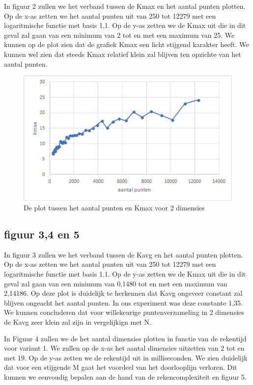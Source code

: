 \documentclass[12pt]{article}
\begin{document}
In figuur 2 zullen we het verband tussen de Kmax en het aantal punten plotten.
Op de x-as zetten we het aantal punten uit van 250 tot 12279 met een logaritmische functie met basis 1,1.
Op de y-as zetten we de Kmax uit die in dit geval zal gaan van een minimum van 2 tot en met een maximum van 25.
We kunnen op de plot zien dat de grafiek Kmax een licht stijgend karakter heeft.
We kunnen wel zien dat steeds Kmax relatief klein zal blijven ten opzichte van het aantal punten.

\begin{figure}
\includegraphics[width=\textwidth]{punten-Kmax.png}
\caption{De plot tussen het aantal punten en Kmax voor 2 dimensies}
\end{figure}

\subsection{figuur 3,4 en 5}

In figuur 3 zullen we het verband tussen de Kavg en het aantal punten plotten.
Op de x-as zetten we het aantal punten uit van 250 tot 12279 met een logaritmische functie met basis 1.1.
Op de y-as zetten we de Kmax uit die in dit geval zal gaan van een minimum van 0,1480 tot en met een maximum van 2,14186.
Op deze plot is duidelijk te herkennen dat Kavg ongeveer constant zal blijven ongeacht het aantal punten.
In ons experiment was deze constante 1,35.
We kunnen concluderen dat voor willekeurige puntenverzameling in 2 dimensies de Kavg zeer klein zal zijn in vergelijkign met N.

In Figuur 4 zullen we de het aantal dimensies plotten in functie van de rekentijd voor variant 1.
We zullen op de x-as het aantal dimensies uitzetten van 2 tot en met 19.
Op de y-as zetten we de rekentijd uit in milliseconden.
We zien duidelijk dat voor een stijgende M gaat het voordeel van het doorlooplijn verloren.
Dit kunnen we eenvoudig bepalen aan de hand van de rekencomplexiteit en figuur 5.
\end{document}

